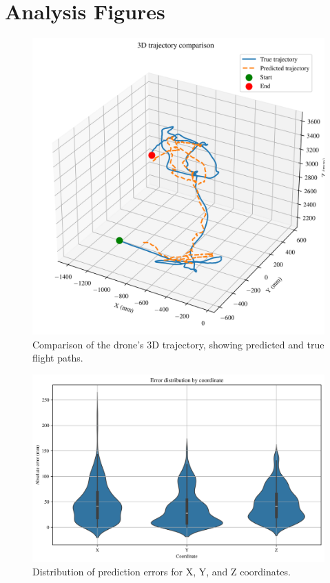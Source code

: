 \documentclass{article}
\begin{document}
	
	\section{Analysis Figures}
	
	\begin{figure}[H]
		\centering
		\includegraphics[width=6.0in]{figures/Figure3_3D_Trajectory.png}
		\caption{Comparison of the drone's 3D trajectory, showing predicted and true flight paths.}
		\label{fig:Figure3_3D_Trajectory}
	\end{figure}
	
	\begin{figure}[H]
		\centering
		\includegraphics[width=6.0in]{figures/Figure4_Error_Distribution.png}
		\caption{Distribution of prediction errors for X, Y, and Z coordinates.}
		\label{fig:Figure4_Error_Distribution}
	\end{figure}
	
\end{document}

